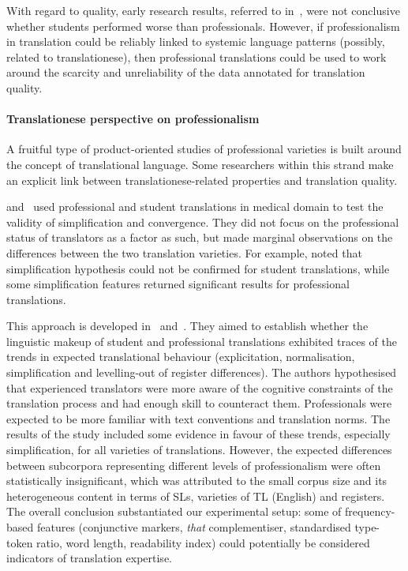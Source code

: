 With regard to quality, early research results, referred to in~\citet{Daems2017}, were not conclusive whether students performed worse than professionals. However, if professionalism in translation could be reliably linked to systemic language patterns (possibly, related to translationese), then professional translations could be used to work around the scarcity and unreliability of the data annotated for translation quality.

\paragraph{Translationese perspective on professionalism} A fruitful type of product-oriented studies of professional varieties is built around the concept of translational language. Some researchers within this strand make an explicit link between translationese-related properties and translation quality.  

\citet{Corpas2008} and~\citet{Ilisei2012} used professional and student translations in medical domain to test the validity of simplification and convergence. They did not focus on the professional status of translators as a factor as such, but made marginal observations on the differences between the two translation varieties. For example, \citet{Corpas2008} noted that simplification hypothesis could not be confirmed for student translations, while some simplification features returned significant results for professional translations.

This approach is developed in~\citet{Redelinghuys2015} and~\citet{Redelinghuys2016}. They aimed to establish whether the linguistic makeup of student and professional translations exhibited traces of the trends in expected translational behaviour (explicitation, normalisation, simplification and levelling-out of register differences). The authors hypothesised that experienced translators were more aware of the cognitive constraints of the translation process and had enough skill to counteract them. Professionals were expected to be more familiar with text conventions and translation norms. The results of the study included some evidence in favour of these trends, especially simplification, for all varieties of translations. However, the expected differences between subcorpora representing different levels of professionalism were often statistically insignificant, which was attributed to the small corpus size and its heterogeneous content in terms of SLs, varieties of TL (English) and registers. The overall conclusion substantiated our experimental setup: some of frequency-based features (conjunctive markers, \textit{that} complementiser, standardised type-token ratio, word length, readability index) could potentially be considered indicators of translation expertise.

